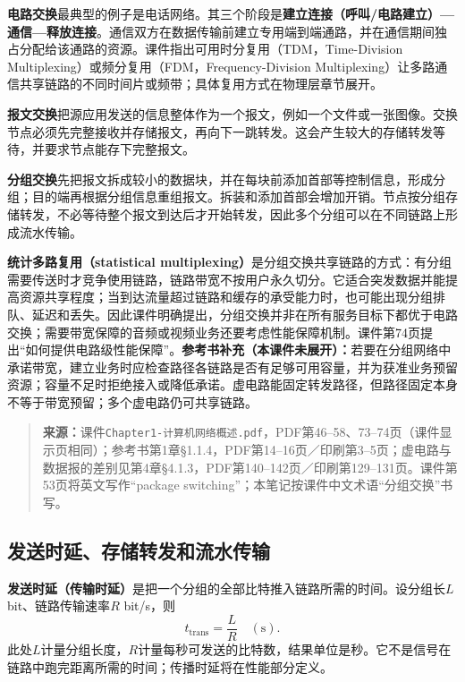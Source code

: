 \textbf{电路交换}最典型的例子是电话网络。其三个阶段是\textbf{建立连接（呼叫/电路建立）—通信—释放连接}。通信双方在数据传输前建立专用端到端通路，并在通信期间独占分配给该通路的资源。课件指出可用时分复用（TDM，Time-Division Multiplexing）或频分复用（FDM，Frequency-Division Multiplexing）让多路通信共享链路的不同时间片或频带；具体复用方式在物理层章节展开。

\textbf{报文交换}把源应用发送的信息整体作为一个报文，例如一个文件或一张图像。交换节点必须先完整接收并存储报文，再向下一跳转发。这会产生较大的存储转发等待，并要求节点能存下完整报文。

\textbf{分组交换}先把报文拆成较小的数据块，并在每块前添加首部等控制信息，形成分组；目的端再根据分组信息重组报文。拆装和添加首部会增加开销。节点按分组存储转发，不必等待整个报文到达后才开始转发，因此多个分组可以在不同链路上形成流水传输。

\textbf{统计多路复用（statistical multiplexing）}是分组交换共享链路的方式：有分组需要传送时才竞争使用链路，链路带宽不按用户永久切分。它适合突发数据并能提高资源共享程度；当到达流量超过链路和缓存的承受能力时，也可能出现分组排队、延迟和丢失。因此课件明确提出，分组交换并非在所有服务目标下都优于电路交换；需要带宽保障的音频或视频业务还要考虑性能保障机制。课件第74页提出“如何提供电路级性能保障”。\textbf{参考书补充（本课件未展开）：}若要在分组网络中承诺带宽，建立业务时应检查路径各链路是否有足够可用容量，并为获准业务预留资源；容量不足时拒绝接入或降低承诺。虚电路能固定转发路径，但路径固定本身不等于带宽预留；多个虚电路仍可共享链路。

\begin{quote}\small\textbf{来源：}课件\texttt{Chapter1-计算机网络概述.pdf}，PDF第46--58、73--74页（课件显示页相同）；参考书第1章§1.1.4，PDF第14--16页／印刷第3--5页；虚电路与数据报的差别见第4章§4.1.3，PDF第140--142页／印刷第129--131页。课件第53页将英文写作“package switching”；本笔记按课件中文术语“分组交换”书写。\end{quote}
\annotationarea[4]

\subsection{发送时延、存储转发和流水传输}

\textbf{发送时延（传输时延）}是把一个分组的全部比特推入链路所需的时间。设分组长$L$ bit、链路传输速率$R$ bit/s，则
\[
 t_{\mathrm{trans}}=\frac{L}{R}\quad(\mathrm{s}).
\]
此处$L$计量分组长度，$R$计量每秒可发送的比特数，结果单位是秒。它不是信号在链路中跑完距离所需的时间；传播时延将在性能部分定义。


